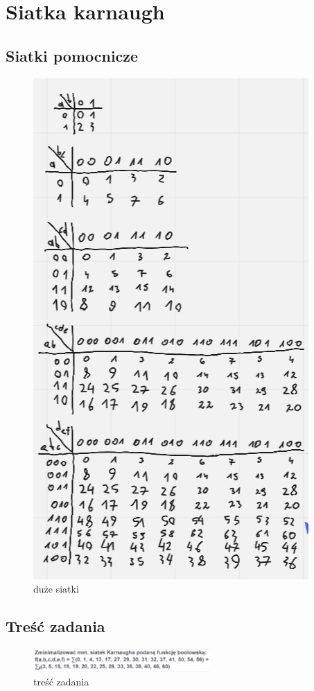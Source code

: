 \section{Siatka karnaugh}

\subsection{Siatki pomocnicze}

\begin{figure}[h!]
    \centering
    \includegraphics[width=.6\textwidth]{images/karnaugh/k_help.png}
    \caption{duże siatki}
    \label{fig:my_label}
\end{figure}

\newpage

\subsection{Treść zadania}

\begin{figure}[h!]
    \centering
    \includegraphics[width=0.6\textwidth]{images/karnaugh/k_ex.png}
    \caption{treść zadania}
    \label{fig:my_label}
\end{figure}

